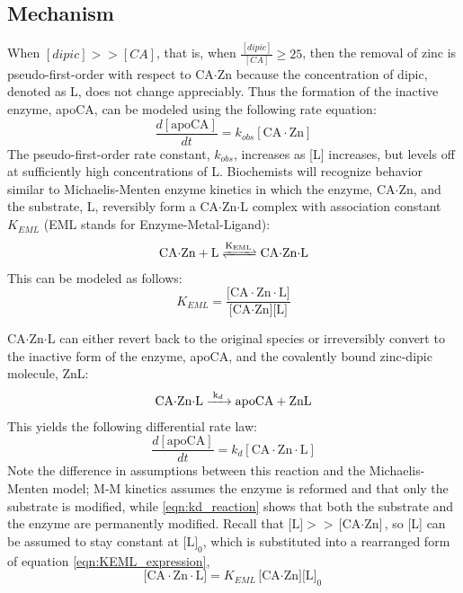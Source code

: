\subsection{Mechanism}
When $[dipic] >> [CA]$, that is, when $\frac{[dipic]}{[CA]} \ge 25$, then the removal of zinc is pseudo-first-order with respect to CA$\cdot$Zn because the concentration of dipic, denoted as L, does not change appreciably. Thus the formation of the inactive enzyme, apoCA, can be modeled using the following rate equation:
\begin{equation}\label{eqn:apoCA_kobs}
\frac{d[\text{apoCA}]}{dt}=k_{obs}[\text{CA$\cdot$Zn}]
\end{equation}
The pseudo-first-order rate constant, $k_{obs}$, increases as [L] increases, but levels off at sufficiently high concentrations of L. Biochemists will recognize behavior similar to Michaelis-Menten enzyme kinetics in which the enzyme, CA$\cdot$Zn, and the substrate, L, reversibly form a CA$\cdot$Zn$\cdot$L complex with association constant $K_{EML}$ (EML stands for Enzyme-Metal-Ligand):
\begin{align}\label{eqn:KEML_reaction}
\ce{CA$\cdot$Zn + L
<=>[\ce{K_{EML}}]
CA$\cdot$Zn$\cdot$L}
\end{align}
This can be modeled as follows:
\begin{equation}\label{eqn:KEML_expression}
K_{EML}=\frac{\text{[CA$\cdot$Zn$\cdot$L]}}{\text{[CA$\cdot$Zn][L]}}
\end{equation}

CA$\cdot$Zn$\cdot$L can either revert back to the original species or irreversibly convert to the inactive form of the enzyme, apoCA, and the covalently bound zinc-dipic molecule, ZnL:
\begin{align}\label{eqn:kd_reaction}
\ce{CA$\cdot$Zn$\cdot$L
->[\ce{k_{d}}]
apoCA + ZnL}
\end{align}
This yields the following differential rate law:
\begin{equation}\label{eqn:kd_expression}
\frac{d[\text{apoCA}]}{dt}=k_{d}[\text{CA$\cdot$Zn$\cdot$L}]
\end{equation}
Note the difference in assumptions between this reaction and the Michaelis-Menten model; M-M kinetics assumes the enzyme is reformed and that only the substrate is modified, while \eqref{eqn:kd_reaction} shows that both the substrate and the enzyme are permanently modified. Recall that $\text{[L]} >> \text{[CA$\cdot$Zn]}$, so [L] can be assumed to stay constant at $\text{[L]}_0$, which is substituted into a rearranged form of equation \eqref{eqn:KEML_expression},
\begin{equation}\label{eqn:KEML_expression_constant_L}
\text{[CA$\cdot$Zn$\cdot$L]}=K_{EML}\text{[CA$\cdot$Zn][L]}_0
\end{equation}

